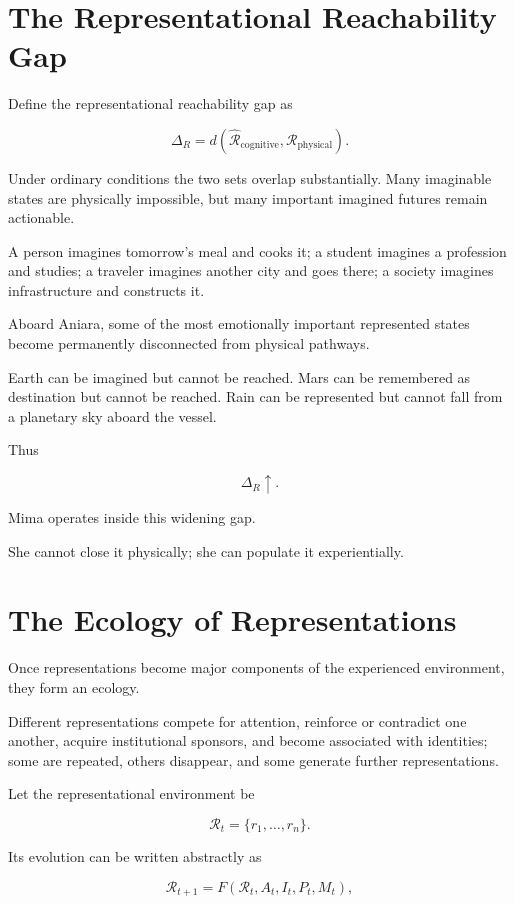\documentclass[11pt,oneside]{book}
\theoremstyle{definition}
\theoremstyle{remark}
\newcommand{\R}{\mathcal{R}}
\begin{document}
\section{The Representational Reachability Gap}

Define the representational reachability gap as

\[
\Delta_R
=
d(
\widehat{\R}_{\mathrm{cognitive}},
\R_{\mathrm{physical}}
).
\]

Under ordinary conditions the two sets overlap substantially. Many imaginable states are physically impossible, but many important imagined futures remain actionable.

A person imagines tomorrow's meal and cooks it; a student imagines a profession and studies; a traveler imagines another city and goes there; a society imagines infrastructure and constructs it.

Aboard Aniara, some of the most emotionally important represented states become permanently disconnected from physical pathways.

Earth can be imagined but cannot be reached. Mars can be remembered as destination but cannot be reached. Rain can be represented but cannot fall from a planetary sky aboard the vessel.

Thus

\[
\Delta_R\uparrow.
\]

Mima operates inside this widening gap.

She cannot close it physically; she can populate it experientially.

\section{The Ecology of Representations}

Once representations become major components of the experienced environment, they form an ecology.

Different representations compete for attention, reinforce or contradict one another, acquire institutional sponsors, and become associated with identities; some are repeated, others disappear, and some generate further representations.

Let the representational environment be

\[
\mathcal R_t
=
\{r_1,\ldots,r_n\}.
\]

Its evolution can be written abstractly as

\[
\mathcal R_{t+1}
=
F(
\mathcal R_t,
A_t,
I_t,
P_t,
M_t
),
\]
\end{document}
